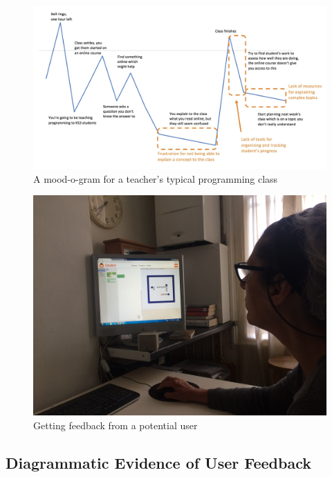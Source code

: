 \documentclass[a4wide, 11pt]{article}
\begin{document}
\begin{figure}[h]
  \includegraphics[scale=0.3]{mood-o-gram.jpeg}
  \centering
  \caption{A mood-o-gram for a teacher's typical programming class}
\end{figure}

\begin{figure}[t]
  \includegraphics[scale=0.1]{user_feedback_session.JPG}
  \centering
  \caption{Getting feedback from a potential user}
\end{figure}

\FloatBarrier
\subsection{Diagrammatic Evidence of User Feedback}
\end{document}

